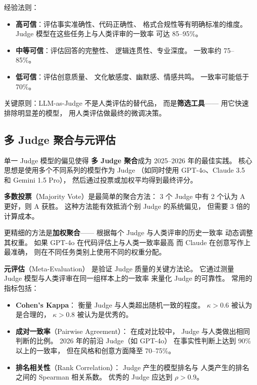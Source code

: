 \begin{whybox}
经验法则：
\begin{itemize}[noitemsep]
  \item \textbf{高可信}：评估事实准确性、代码正确性、
        格式合规性等有明确标准的维度。
        Judge 模型在这些任务上与人类评审的一致率
        可达 85--95\%。
  \item \textbf{中等可信}：评估回答的完整性、
        逻辑连贯性、专业深度。
        一致率约 75--85\%。
  \item \textbf{低可信}：评估创意质量、
        文化敏感度、幽默感、情感共鸣。
        一致率可能低于 70\%。
\end{itemize}
关键原则：LLM-as-Judge 不是人类评估的替代品，
而是\textbf{筛选工具}——
用它快速排除明显差的模型，
用人类评估做最终的微调决策。
\end{whybox}

\subsection{多 Judge 聚合与元评估}

单一 Judge 模型的偏见使得
\textbf{多 Judge 聚合}成为 2025--2026 年的最佳实践。
核心思想是使用多个不同系列的模型作为 Judge
（如同时使用 GPT-4o、Claude 3.5 和 Gemini 1.5 Pro），
然后通过投票或加权平均得到最终评分。

\textbf{多数投票}（Majority Vote）是最简单的聚合方法：
3 个 Judge 中有 2 个认为 A 更好，则 A 获胜。
这种方法能有效抵消个别 Judge 的系统偏见，
但需要 3 倍的计算成本。

更精细的方法是\textbf{加权聚合}——
根据每个 Judge 与人类评审的历史一致率
动态调整其权重。
如果 GPT-4o 在代码评估上与人类一致率最高
而 Claude 在创意写作上最准确，
则在不同任务类别上使用不同的权重分配。

\textbf{元评估}（Meta-Evaluation）
是验证 Judge 质量的关键方法论。
它通过测量 Judge 模型与人类评审在同一组样本上的一致率
来量化 Judge 的可靠性。
常用的指标包括：
\begin{itemize}[noitemsep]
  \item \textbf{Cohen's Kappa}：
        衡量 Judge 与人类超出随机一致的程度。
        $\kappa > 0.6$ 被认为是合理的，
        $\kappa > 0.8$ 被认为是优秀的。
  \item \textbf{成对一致率}（Pairwise Agreement）：
        在成对比较中，
        Judge 与人类做出相同判断的比例。
        2026 年的前沿 Judge（如 GPT-4o）
        在事实性判断上达到 90\% 以上的一致率，
        但在风格和创意方面降至 70--75\%。
  \item \textbf{排名相关性}（Rank Correlation）：
        Judge 产生的模型排名与
        人类产生的排名之间的 Spearman 相关系数。
        优秀的 Judge 应达到 $\rho > 0.9$。
\end{itemize}

